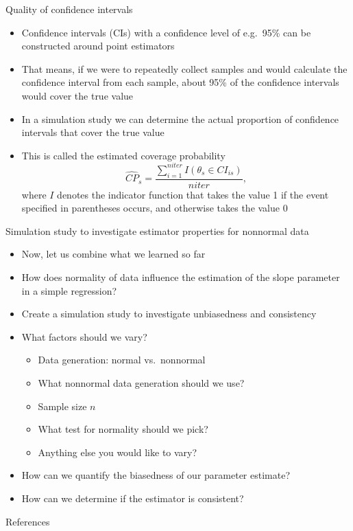 \documentclass[aspectratio=169]{beamer}
\begin{document}
\begin{frame}{Quality of confidence intervals}
\begin{itemize}
  \item Confidence intervals (CIs) with a confidence level of e.g.~95\% can be
    constructed around point estimators
  \item That means, if we were to repeatedly collect samples and would calculate
    the confidence interval from each sample, about 95\% of the confidence
    intervals would cover the true value
  \item In a simulation study we can determine the actual proportion of
    confidence intervals that cover the true value
  \item This is called the estimated coverage probability
  \begin{equation*}
\widehat{CP}_s = \dfrac{\sum_{i = 1}^{niter} I(\theta_s \in CI_{is})}{niter},
\end{equation*}
\noindent where $I$ denotes the indicator function that takes the value 1 if the
event specified in parentheses occurs, and otherwise takes the value 0
\end{itemize}
\end{frame}

\begin{frame}{Simulation study to investigate estimator properties for nonnormal
  data}
  \begin{itemize}[<+->]
    \item Now, let us combine what we learned so far
    \item How does normality of data influence the estimation of the slope
      parameter in a simple regression?
    \item Create a simulation study to investigate unbiasedness and consistency
    \item What factors should we vary?
      \begin{itemize}
        \item Data generation: normal vs.\ nonnormal
        \item What nonnormal data generation should we use?
        \item Sample size $n$
        \item What test for normality should we pick?
        \item Anything else you would like to vary?
      \end{itemize}
    \item How can we quantify the biasedness of our parameter estimate?
    \item How can we determine if the estimator is consistent?
  \end{itemize}
  \vfill
\end{frame}

\appendix
\begin{frame}{References}


\end{frame}
\end{document}
